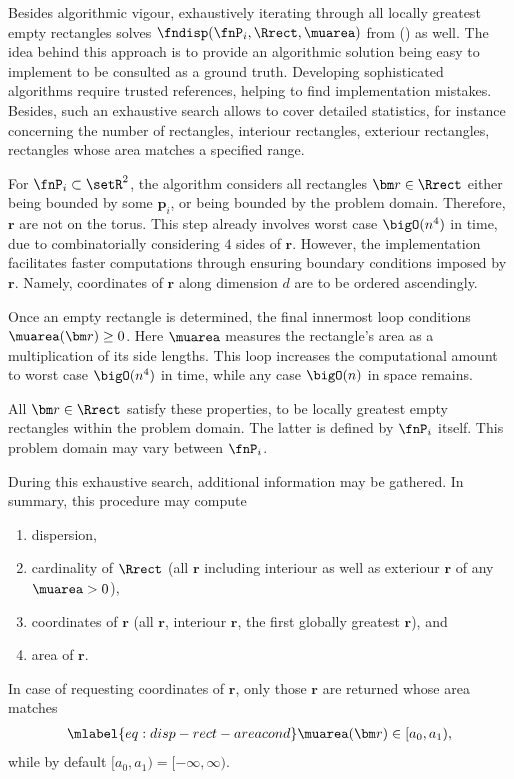 %
Besides algorithmic vigour, exhaustively iterating through all locally greatest empty rectangles solves $\fndisp(\fnP_i, \Rrect, \muarea)$ from () as well. The idea behind this approach is to provide an algorithmic solution being easy to implement to be consulted as a ground truth. Developing sophisticated algorithms require trusted references, helping to find implementation mistakes. Besides, such an exhaustive search allows to cover detailed statistics, for instance concerning the number of rectangles, interiour rectangles, exteriour rectangles, rectangles whose area matches a specified range.

For $\fnP_i \subset \setR^2$, the algorithm considers all rectangles $\bm r \in \Rrect$ either being bounded by some $\bm p_i$, or being bounded by the problem domain. Therefore, $\bm r$ are not on the torus. This step already involves worst case $\bigO(n^4)$ in time, due to combinatorially considering $4$ sides of $\bm r$. However, the implementation facilitates faster computations through ensuring boundary conditions imposed by $\bm r$. Namely, coordinates of $\bm r$ along dimension $d$ are to be ordered ascendingly.

Once an empty rectangle is determined, the final innermost loop conditions $\muarea(\bm r) \geq 0$. Here $\muarea$ measures the rectangle's area as a multiplication of its side lengths. This loop increases the computational amount to worst case $\bigO(n^4)$ in time, while any case $\bigO(n)$ in space remains.

All $\bm r \in \Rrect$ satisfy these properties, to be locally greatest empty rectangles within the problem domain. The latter is defined by $\fnP_i$ itself. This problem domain may vary between $\fnP_i$.

During this exhaustive search, additional information may be gathered. In summary, this procedure may compute
\begin{enumerate}
  \item dispersion,
  \item cardinality of $\Rrect$ (all $\bm r$ including interiour as well as exteriour $\bm r$ of any $\muarea > 0$),
  \item coordinates of $\bm r$ (all $\bm r$, interiour $\bm r$, the first globally greatest $\bm r$), and
  \item area of $\bm r$.
\end{enumerate}

In case of requesting coordinates of $\bm r$, only those $\bm r$ are returned whose area matches
\begin{align}\mlabel{eq:disp-rect-areacond}
  \muarea(\bm r) \in [a_0, a_1),
\end{align}
while by default $[a_0, a_1) = [-\infty, \infty)$.

